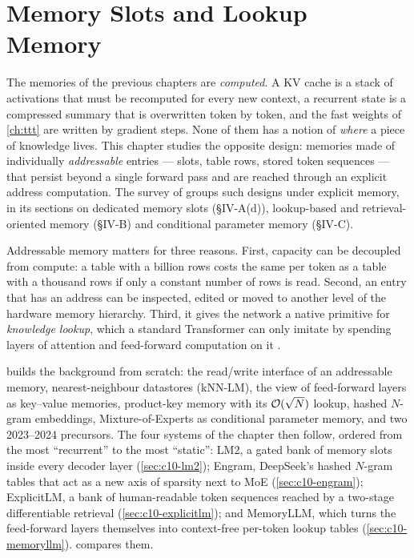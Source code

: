 \chapter{Memory Slots and Lookup Memory}\label{ch:lookup}

The memories of the previous chapters are \emph{computed}. A KV cache is a stack of activations that
must be recomputed for every new context, a recurrent state is a compressed summary that is
overwritten token by token, and the fast weights of \cref{ch:ttt} are written by gradient steps.
None of them has a notion of \emph{where} a piece of knowledge lives. This chapter studies the
opposite design: memories made of individually \emph{addressable} entries --- slots, table rows,
stored token sequences --- that persist beyond a single forward pass and are reached through an
explicit address computation. The survey of \citet{zhoubian2026memory} groups such designs under
explicit memory, in its sections on dedicated memory slots (\S IV-A(d)), lookup-based and
retrieval-oriented memory (\S IV-B) and conditional parameter memory (\S IV-C).

Addressable memory matters for three reasons. First, capacity can be decoupled from compute: a
table with a billion rows costs the same per token as a table with a thousand rows if only a
constant number of rows is read. Second, an entry that has an address can be inspected, edited or
moved to another level of the hardware memory hierarchy. Third, it gives the network a native
primitive for \emph{knowledge lookup}, which a standard Transformer can only imitate by spending
layers of attention and feed-forward computation on it \citep{cheng2026engram}.

 builds the background from scratch: the read/write interface of an
addressable memory, nearest-neighbour datastores (kNN-LM), the view of feed-forward layers as
key--value memories, product-key memory with its $\mathcal{O}(\sqrt{N})$ lookup, hashed $N$-gram
embeddings, Mixture-of-Experts as conditional parameter memory, and two 2023--2024 precursors.
The four systems of the chapter then follow, ordered from the most ``recurrent'' to the most
``static'': LM2, a gated bank of memory slots inside every decoder layer
(\cref{sec:c10-lm2}); Engram, DeepSeek's hashed $N$-gram tables that act as a new axis of
sparsity next to MoE (\cref{sec:c10-engram}); ExplicitLM, a bank of human-readable token
sequences reached by a two-stage differentiable retrieval (\cref{sec:c10-explicitlm}); and
MemoryLLM, which turns the feed-forward layers themselves into context-free per-token lookup
tables (\cref{sec:c10-memoryllm}).  compares them.

